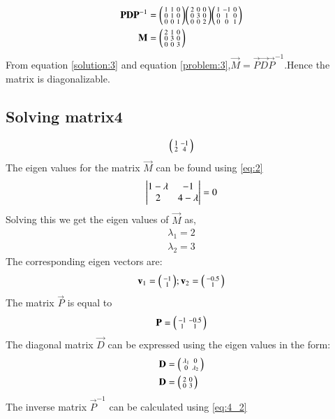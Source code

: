 \documentclass[journal,12pt,twocolumn]{IEEEtran}
\begin{document}
\begin{align}
	\mathbf{P}\mathbf{D}\mathbf{P}^{-1}&=\begin{psmallmatrix}1&1&0\\0&1&0\\0&0&1\end{psmallmatrix}\begin{psmallmatrix}2&0&0\\0&3&0\\0&0&2\end{psmallmatrix}\begin{psmallmatrix}1&-1&0\\0&1&0\\0&0&1\end{psmallmatrix}\\
	\mathbf{M}&=\begin{psmallmatrix}2&1&0\\0&3&0\\0 & 0&3\end{psmallmatrix}\label{solution:3}	
\end{align}
From equation \eqref{solution:3} and equation \eqref{problem:3},$\vec{M} = \vec{P}\vec{D}\vec{P}^{-1}$.Hence the matrix is diagonalizable. 

\subsection{Solving matrix4 }
\begin{align}
	\begin{psmallmatrix}1&-1\\2&4\end{psmallmatrix}\label{problem:4}
\end{align}
The eigen values for the matrix $\vec{M}$ can be found using \eqref{eq:2}
\begin{align}
	\begin{vmatrix}1- \lambda &  -1\\2& 4-\lambda\end{vmatrix}=0
\end{align}
Solving this we get the eigen values of $\vec{M}$ as, 
\begin{align}
	\lambda_1 = 2\\
	\lambda_2=  3
\end{align}
The corresponding eigen vectors are:
\begin{align}
	\mathbf v_1 = \begin{psmallmatrix}-1\\ 1\end{psmallmatrix};
	\mathbf v_2 = \begin{psmallmatrix}-0.5\\ 1\end{psmallmatrix}
\end{align}
The matrix $\vec{P}$ is equal to
\begin{align}
	\mathbf{P}=\begin{psmallmatrix}-1&-0.5\\1&1\end{psmallmatrix}\label{eq:4_1}
\end{align}
The diagonal matrix $\vec{D}$ can be expressed using the eigen values in the form:
\begin{align}
	\mathbf{D}&=\begin{psmallmatrix}\lambda_1&0\\0&\lambda_2\end{psmallmatrix}\\
	\mathbf{D} &=\begin{psmallmatrix}2&0\\0&3\end{psmallmatrix}\label{eq:4_2}
\end{align}
The inverse matrix $\vec{P}^{-1}$ can be calculated using \eqref{eq:4_2}
\end{document}
